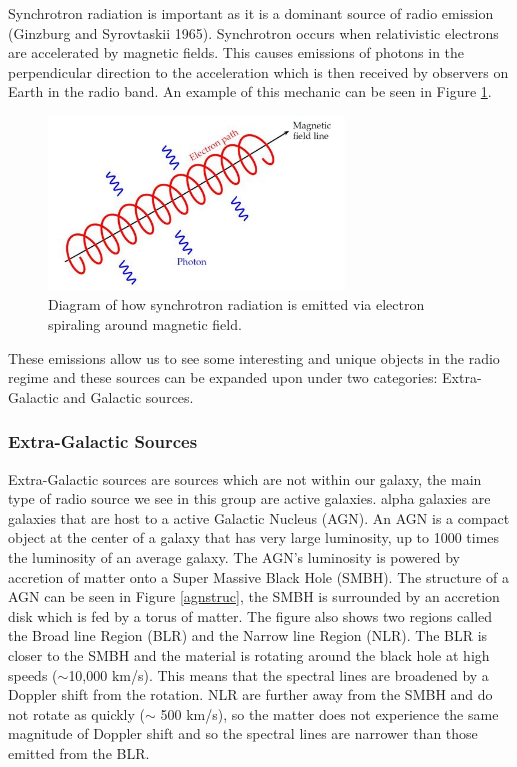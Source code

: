\documentclass[a4paper, 10pt]{article}
\begin{document}
Synchrotron radiation is important as it is a dominant source of radio emission (Ginzburg and Syrovtaskii 1965). Synchrotron occurs when relativistic electrons are accelerated by magnetic fields. This causes emissions of photons in the perpendicular direction to the acceleration which is then received by observers on Earth in the radio band. An example of this mechanic can be seen in Figure \ref{sync}.\\
\begin{figure}[H]
\begin{center}
	\includegraphics[width=0.7\textwidth]{sync}
	\caption{Diagram of how synchrotron radiation is emitted via electron spiraling around magnetic field\footnotemark. }
	\label{sync}
\end{center}
\end{figure}
These emissions allow us to see some interesting and unique objects in the radio regime and these sources can be expanded upon under two categories: Extra-Galactic and Galactic sources.


\subsubsection{Extra-Galactic Sources}
Extra-Galactic sources are sources which are not within our galaxy, the main type of radio source we see in this group are active galaxies. alpha galaxies are galaxies that are host to a active Galactic Nucleus (AGN). An AGN is a compact object at the center of a galaxy that has very large luminosity, up to 1000 times the luminosity of an average galaxy. The AGN's luminosity is powered by accretion of matter onto a Super Massive Black Hole (SMBH). The structure of a AGN can be seen in Figure \ref{agnstruc}, the SMBH is surrounded by an accretion disk which is fed by a torus of matter. The figure also shows two regions called the Broad line Region (BLR) and the Narrow line Region (NLR). The BLR is closer to the SMBH and the material is rotating around the black hole at high speeds ($\sim$10,000 km/s). This means that the spectral lines are broadened by a Doppler shift from the rotation. NLR are further away from the SMBH and do not rotate as quickly ($\sim$ 500 km/s), so the matter does not experience the same magnitude of Doppler shift and so the spectral lines are narrower than those emitted from the BLR.
\end{document}
